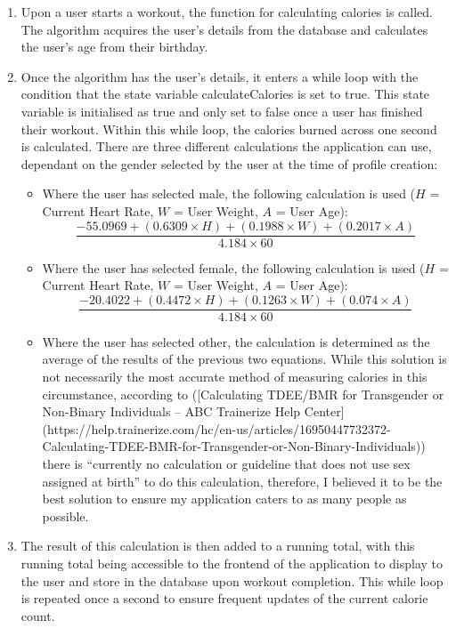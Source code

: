 \documentclass{l4proj}
\begin{document}
\begin{enumerate}
    \item Upon a user starts a workout, the function for calculating calories is called. The algorithm acquires the user’s details from the database and calculates the user’s age from their birthday.
    \item Once the algorithm has the user’s details, it enters a while loop with the condition that the state variable calculateCalories is set to true. This state variable is initialised as true and only set to false once a user has finished their workout. Within this while loop, the calories burned across one second is calculated. There are three different calculations the application can use, dependant on the gender selected by the user at the time of profile creation:
    \begin{itemize}
        \item Where the user has selected male, the following calculation is used ($H$ = Current Heart Rate, $W$ = User Weight, $A$ = User Age):
        $$
            \frac{-55.0969 + (0.6309 \times H) + (0.1988 \times W) + (0.2017 \times A)}{4.184 \times 60}
        $$
        \item Where the user has selected female, the following calculation is used ($H$ = Current Heart Rate, $W$ = User Weight, $A$ = User Age):
        $$
            \frac{-20.4022 + (0.4472 \times H) + (0.1263 \times W) + (0.074 \times A)}{4.184 \times 60}
        $$
        \item Where the user has selected other, the calculation is determined as the average of the results of the previous two equations. While this solution is not necessarily the most accurate method of measuring calories in this circumstance, according to ([Calculating TDEE/BMR for Transgender or Non-Binary Individuals – ABC Trainerize Help Center](https://help.trainerize.com/hc/en-us/articles/16950447732372-Calculating-TDEE-BMR-for-Transgender-or-Non-Binary-Individuals)) there is “currently no calculation or guideline that does not use sex assigned at birth” to do this calculation, therefore, I believed it to be the best solution to ensure my application caters to as many people as possible.
    \end{itemize}

    \item The result of this calculation is then added to a running total, with this running total being accessible to the frontend of the application to display to the user and store in the database upon workout completion. This while loop is repeated once a second to ensure frequent updates of the current calorie count.
    
\end{enumerate}
\end{document}
